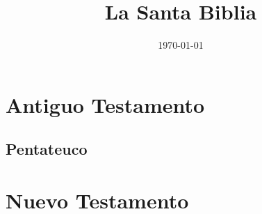 
\newcommand{\titulo}{La Santa Biblia}
\newcommand{\revision}{Reina-Valera 1960}

\title{\titulo}
\date{\today}
\author{}


	\frontmatter
	
	\tableofcontents
	\mainmatter
	\linespread{2}
	\part*{Antiguo Testamento}
	\startornaments
	\chapter*{Pentateuco}
	
	\flushcolsend
	\flushcolsend
	\flushcolsend
	\flushcolsend
	\stopornaments
	
	\part*{Nuevo Testamento}
	\startornaments
	
	\stopornaments
	


%	

